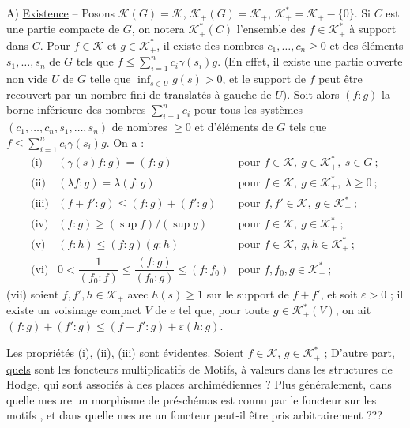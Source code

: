 A) \uline{Existence} -- Posons $\mathcal K(G)=\mathcal K$,
$\mathcal K_+(G)=\mathcal K_+$, $\mathcal K_+^*=\mathcal K_+-\{0\}$.
Si $C$ est une partie compacte de $G$, on notera $\mathcal K_+^*(C)$
l’ensemble des $f\in\mathcal K_+^*$ à support dans $C$.
Pour $f\in\mathcal K$ et $g\in\mathcal K_+^*$, il existe des nombres
$c_1,\ldots,c_n\ge0$ et des éléments $s_1,\ldots,s_n$ de $G$ tels que
$f\le\sum_{i=1}^n c_i\gamma(s_i)g$.
(En effet, il existe une partie ouverte non vide $U$ de $G$ telle que
$\inf_{s\in U}g(s)>0$, et le support de $f$ peut être recouvert par un nombre
fini de translatés à gauche de $U$).
Soit alors $(f:g)$ la borne inférieure des nombres $\sum_{i=1}^n c_i$
pour tous les systèmes $(c_1,\ldots,c_n,s_1,\ldots,s_n)$ de nombres $\ge0$
et d’éléments de $G$ tels que $f\le\sum_{i=1}^n c_i\gamma(s_i)g$.
On a :
\[
\begin{array}{lll}
\text{(i)} & (\gamma(s)f:g)=(f:g) & \text{pour }f\in\mathcal K,\ g\in\mathcal K_+^*,\ s\in G\ ;\\
\text{(ii)} & (\lambda f:g)=\lambda(f:g) & \text{pour }f\in\mathcal K,\ g\in\mathcal K_+^*,\ \lambda\ge0\ ;\\
\text{(iii)} & (f+f':g)\le(f:g)+(f':g) & \text{pour }f,f'\in\mathcal K,\ g\in\mathcal K_+^*\ ;\\
\text{(iv)} & (f:g)\ge(\sup f)/(\sup g) & \text{pour }f\in\mathcal K,\ g\in\mathcal K_+^*\ ;\\
\text{(v)} & (f:h)\le(f:g)(g:h) & \text{pour }f\in\mathcal K,\ g,h\in\mathcal K_+^*\ ;\\
\text{(vi)} & 0<\dfrac1{(f_0:f)}\le\dfrac{(f:g)}{(f_0:g)}\le(f:f_0)
& \text{pour }f,f_0,g\in\mathcal K_+^*\ ;
\end{array}
\]
(vii) soient $f,f',h\in\mathcal K_+$ avec $h(s)\ge1$ sur le support de $f+f'$,
et soit $\varepsilon>0$ ; il existe un voisinage compact $V$ de $e$ tel que,
pour toute $g\in\mathcal K_+^*(V)$, on ait
$(f:g)+(f':g)\le(f+f':g)+\varepsilon(h:g)$.

Les propriétés (i), (ii), (iii) sont évidentes.
Soient $f\in\mathcal K$, $g\in\mathcal K_+^*$ ;
D’autre part, \uline{quels} sont les foncteurs multiplicatifs de Motifs,
à valeurs dans les structures de Hodge,
qui sont associés à des places archimédiennes ?
Plus généralement, dans quelle mesure un morphisme de préschémas
 est connu par le foncteur sur les motifs
, et dans quelle mesure un foncteur
 peut-il être pris arbitrairement ???

